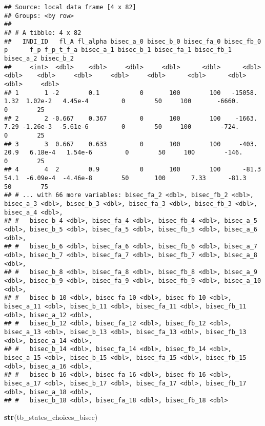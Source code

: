 \documentclass[
]{book}
\newenvironment{Shaded}{\begin{snugshade}}{\end{snugshade}}
\newcommand{\KeywordTok}[1]{\textcolor[rgb]{0.13,0.29,0.53}{\textbf{#1}}}
\newcommand{\NormalTok}[1]{#1}
\begin{document}
\begin{verbatim}
## Source: local data frame [4 x 82]
## Groups: <by row>
## 
## # A tibble: 4 x 82
##   INDI_ID   fl_A fl_alpha bisec_a_0 bisec_b_0 bisec_fa_0 bisec_fb_0     p      f_p f_p_t_f_a bisec_a_1 bisec_b_1 bisec_fa_1 bisec_fb_1 bisec_a_2 bisec_b_2
##     <int>  <dbl>    <dbl>     <dbl>     <dbl>      <dbl>      <dbl> <dbl>    <dbl>     <dbl>     <dbl>     <dbl>      <dbl>      <dbl>     <dbl>     <dbl>
## 1       1 -2        0.1           0       100        100   -15058.   1.32  1.02e-2   4.45e-4         0        50     100       -6660.          0        25
## 2       2 -0.667    0.367         0       100        100    -1663.   7.29 -1.26e-3  -5.61e-6         0        50     100        -724.          0        25
## 3       3  0.667    0.633         0       100        100     -403.  20.9   6.18e-4   1.54e-6         0        50     100        -146.          0        25
## 4       4  2        0.9           0       100        100      -81.3 54.1  -6.09e-4  -4.46e-8        50       100       7.33      -81.3        50        75
## # ... with 66 more variables: bisec_fa_2 <dbl>, bisec_fb_2 <dbl>, bisec_a_3 <dbl>, bisec_b_3 <dbl>, bisec_fa_3 <dbl>, bisec_fb_3 <dbl>, bisec_a_4 <dbl>,
## #   bisec_b_4 <dbl>, bisec_fa_4 <dbl>, bisec_fb_4 <dbl>, bisec_a_5 <dbl>, bisec_b_5 <dbl>, bisec_fa_5 <dbl>, bisec_fb_5 <dbl>, bisec_a_6 <dbl>,
## #   bisec_b_6 <dbl>, bisec_fa_6 <dbl>, bisec_fb_6 <dbl>, bisec_a_7 <dbl>, bisec_b_7 <dbl>, bisec_fa_7 <dbl>, bisec_fb_7 <dbl>, bisec_a_8 <dbl>,
## #   bisec_b_8 <dbl>, bisec_fa_8 <dbl>, bisec_fb_8 <dbl>, bisec_a_9 <dbl>, bisec_b_9 <dbl>, bisec_fa_9 <dbl>, bisec_fb_9 <dbl>, bisec_a_10 <dbl>,
## #   bisec_b_10 <dbl>, bisec_fa_10 <dbl>, bisec_fb_10 <dbl>, bisec_a_11 <dbl>, bisec_b_11 <dbl>, bisec_fa_11 <dbl>, bisec_fb_11 <dbl>, bisec_a_12 <dbl>,
## #   bisec_b_12 <dbl>, bisec_fa_12 <dbl>, bisec_fb_12 <dbl>, bisec_a_13 <dbl>, bisec_b_13 <dbl>, bisec_fa_13 <dbl>, bisec_fb_13 <dbl>, bisec_a_14 <dbl>,
## #   bisec_b_14 <dbl>, bisec_fa_14 <dbl>, bisec_fb_14 <dbl>, bisec_a_15 <dbl>, bisec_b_15 <dbl>, bisec_fa_15 <dbl>, bisec_fb_15 <dbl>, bisec_a_16 <dbl>,
## #   bisec_b_16 <dbl>, bisec_fa_16 <dbl>, bisec_fb_16 <dbl>, bisec_a_17 <dbl>, bisec_b_17 <dbl>, bisec_fa_17 <dbl>, bisec_fb_17 <dbl>, bisec_a_18 <dbl>,
## #   bisec_b_18 <dbl>, bisec_fa_18 <dbl>, bisec_fb_18 <dbl>
\end{verbatim}

\begin{Shaded}
\begin{Highlighting}[]
\KeywordTok{str}\NormalTok{(tb_states_choices_bisec)}
\end{Highlighting}
\end{Shaded}
\end{document}
